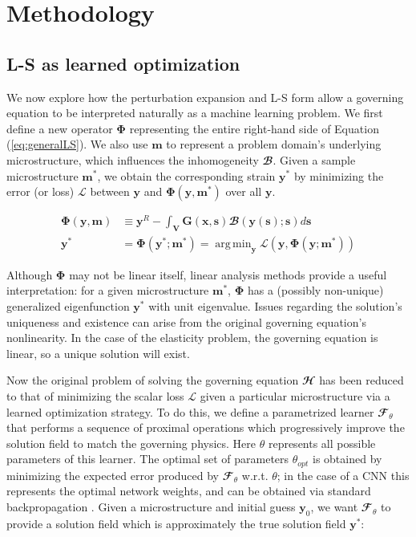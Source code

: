 \documentclass[3p, preprint]{elsarticle}
\DeclareMathOperator*{\argmin}{arg\,min}
\newcommand{\bmx}{\bm{x}}
\newcommand{\bms}{\bm{s}}
\newcommand{\bmm}{\bm{m}}
\newcommand{\bmy}{\bm{y}}
\newcommand{\Phiop}{\bm{\Phi}}
\newcommand{\Hop}{\mathbfcal{H}}
\newcommand{\Bop}{\mathbfcal{B}}
\newcommand{\Loss}{\mathscr{L}}
\newcommand{\Ftheta}{\mathbfcal{F}_\theta}
\newenvironment{revision} {} {}
\begin{document}
\section{Methodology}\label{sec:methodology}
\subsection{L-S as learned optimization}\label{subsec:general_math}

We now explore how the perturbation expansion and L-S form allow a governing equation to be interpreted naturally as a machine learning problem. We first define a new operator $\Phiop$ representing the entire right-hand side of Equation (\ref{eq:generalLS}). We also use $\bmm$ to represent a problem domain's underlying microstructure, which influences the inhomogeneity $\Bop$. Given a sample microstructure $\bmm^*$, we obtain the corresponding strain $\bmy^*$ by minimizing the error (or loss) $\Loss$ between $\bmy$ and $\Phiop(\bmy, \bmm^*)$ over all $\bmy$.

\begin{align}
    \Phiop(\bmy, \bmm) &\equiv \bmy^R - \int_{\bm{V}} \bm{G}(\bmx, \bms) \Bop(\bmy(\bms); \bms) d\bms \\
    \bmy^* & = \Phiop( \bmy^*; \bm{m}^* ) = \argmin_{\bmy} \Loss\left( \bmy, \Phiop( \bmy; \bm{m}^* ) \right) \label{eq:var}
\end{align}

Although $\Phiop$ may not be linear itself, linear analysis methods provide a useful interpretation: for a given microstructure $\bmm^*$, $\Phiop$ has a (possibly non-unique) generalized eigenfunction $\bmy^*$ with unit eigenvalue. Issues regarding the solution's uniqueness and existence can arise from the original governing equation's nonlinearity. In the case of the elasticity problem, the governing equation is linear, so a unique solution will exist.

Now the original problem of solving the governing equation $\Hop$ has been reduced to that of minimizing the \begin{revision}
scalar
\end{revision} loss $\Loss$ given a particular microstructure via a learned optimization strategy. To do this, we define a parametrized learner $\Ftheta$ that performs a sequence of proximal operations which progressively improve the solution field to match the governing physics. Here $\theta$ represents all possible parameters of this learner. The optimal set of parameters $\theta_{opt}$ is obtained by minimizing the expected error produced by $\Ftheta$ w.r.t. $\theta$; in the case of a CNN this represents the optimal network weights, and can be obtained via standard backpropagation \cite{rumelhart1988_backprop}. Given a microstructure and initial guess $\bmy_0$, we want $\Ftheta$ to provide a solution field which is approximately the true solution field $\bmy^*$:
\end{document}
